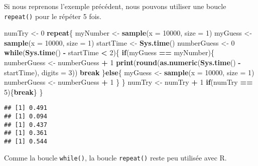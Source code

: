 \documentclass[]{book}
\newenvironment{Shaded}{\begin{snugshade}}{\end{snugshade}}
\newcommand{\KeywordTok}[1]{\textcolor[rgb]{0.13,0.29,0.53}{\textbf{#1}}}
\newcommand{\DataTypeTok}[1]{\textcolor[rgb]{0.13,0.29,0.53}{#1}}
\newcommand{\DecValTok}[1]{\textcolor[rgb]{0.00,0.00,0.81}{#1}}
\newcommand{\StringTok}[1]{\textcolor[rgb]{0.31,0.60,0.02}{#1}}
\newcommand{\ControlFlowTok}[1]{\textcolor[rgb]{0.13,0.29,0.53}{\textbf{#1}}}
\newcommand{\OperatorTok}[1]{\textcolor[rgb]{0.81,0.36,0.00}{\textbf{#1}}}
\newcommand{\NormalTok}[1]{#1}
\theoremstyle{definition}
\theoremstyle{definition}
\theoremstyle{definition}
\theoremstyle{remark}
\begin{document}
Si nous reprenons l'exemple précédent, nous pouvons utiliser une boucle
\texttt{repeat()} pour le répéter 5 fois.

\begin{Shaded}
\begin{Highlighting}[]
\NormalTok{numTry <-}\StringTok{ }\DecValTok{0}
\ControlFlowTok{repeat}\NormalTok{\{}
\NormalTok{  myNumber <-}\StringTok{ }\KeywordTok{sample}\NormalTok{(}\DataTypeTok{x =} \DecValTok{10000}\NormalTok{, }\DataTypeTok{size =} \DecValTok{1}\NormalTok{)}
\NormalTok{  myGuess <-}\StringTok{ }\KeywordTok{sample}\NormalTok{(}\DataTypeTok{x =} \DecValTok{10000}\NormalTok{, }\DataTypeTok{size =} \DecValTok{1}\NormalTok{)}
\NormalTok{  startTime <-}\StringTok{ }\KeywordTok{Sys.time}\NormalTok{()}
\NormalTok{  numberGuess <-}\StringTok{ }\DecValTok{0}
  \ControlFlowTok{while}\NormalTok{(}\KeywordTok{Sys.time}\NormalTok{() }\OperatorTok{-}\StringTok{ }\NormalTok{startTime }\OperatorTok{<}\StringTok{ }\DecValTok{2}\NormalTok{)\{}
    \ControlFlowTok{if}\NormalTok{(myGuess }\OperatorTok{==}\StringTok{ }\NormalTok{myNumber)\{}
\NormalTok{      numberGuess <-}\StringTok{ }\NormalTok{numberGuess }\OperatorTok{+}\StringTok{ }\DecValTok{1}
      \KeywordTok{print}\NormalTok{(}\KeywordTok{round}\NormalTok{(}\KeywordTok{as.numeric}\NormalTok{(}\KeywordTok{Sys.time}\NormalTok{() }\OperatorTok{-}\StringTok{ }\NormalTok{startTime), }\DataTypeTok{digits =} \DecValTok{3}\NormalTok{))}
      \ControlFlowTok{break}
\NormalTok{    \}}\ControlFlowTok{else}\NormalTok{\{}
\NormalTok{      myGuess <-}\StringTok{ }\KeywordTok{sample}\NormalTok{(}\DataTypeTok{x =} \DecValTok{10000}\NormalTok{, }\DataTypeTok{size =} \DecValTok{1}\NormalTok{)}
\NormalTok{      numberGuess <-}\StringTok{ }\NormalTok{numberGuess }\OperatorTok{+}\StringTok{ }\DecValTok{1}
\NormalTok{    \}}
\NormalTok{  \}}
\NormalTok{  numTry <-}\StringTok{ }\NormalTok{numTry }\OperatorTok{+}\StringTok{ }\DecValTok{1}
  \ControlFlowTok{if}\NormalTok{(numTry }\OperatorTok{==}\StringTok{ }\DecValTok{5}\NormalTok{)\{}\ControlFlowTok{break}\NormalTok{\}}
\NormalTok{\}}
\end{Highlighting}
\end{Shaded}

\begin{verbatim}
## [1] 0.491
## [1] 0.094
## [1] 0.437
## [1] 0.361
## [1] 0.544
\end{verbatim}

Comme la boucle \texttt{while()}, la boucle \texttt{repeat()} reste peu
utilisée avec R.
\end{document}
